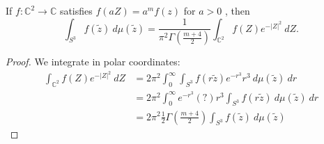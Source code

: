 \documentclass{article}
\begin{document}
\begin{theorem}
    If $f: \mathbb{C}^{2} \rightarrow \mathbb{C}$  satisfies $f(aZ) = a^{m}f(z)$  for $a>0$ , then
    \begin{equation}
        \int_{S^{3}} f(\tilde{z}) \ d\mu(\tilde{z})
        =
        \frac{1}{\pi^{2} \Gamma(\frac{m+4}{2})} \int_{\mathbb{C}^{2}} f(Z) e^{- | Z |^{2}} \ dZ.
    \end{equation}
\end{theorem}

\begin{proof}
    We integrate in polar coordinates:
    \begin{equation}
        \begin{split}
            \int_{\mathbb{C}^{2}} f(Z) e^{-| Z |^{2}} \ dZ 
            &= 2\pi^{2} \int^{\infty}_{0} \int^{}_{S^{3}} f(r \tilde{z}) e^{-r^{3}} r^{3} \ d\mu(\tilde{z}) \ dr \\
            &= 2\pi^{2} \int^{\infty}_{0} e^{-r^{3}}(?) r^{3} \int^{}_{S^{3}} f(r \tilde{z}) \ d\mu(\tilde{z}) \ dr \\
            &= 2 \pi^{2} \frac{1}{2} \Gamma (\frac{m+4}{2}) \int_{S^{3}} f(\tilde{z}) \ d\mu(\tilde{z})
        \end{split}
    \end{equation}
\end{proof}
\end{document}
